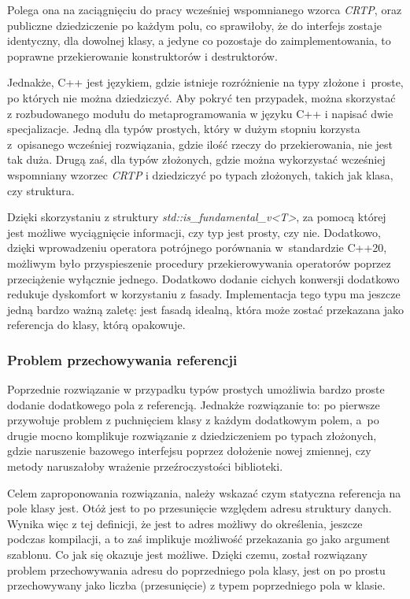 \documentclass[12pt]{article}
\newcommand{\n}{\newline}
\begin{document}
{{{				Polega ona na zaciągnięciu do pracy wcześniej wspomnianego wzorca {\it CRTP}, oraz publiczne dziedziczenie po każdym polu, co sprawiłoby, że
				do interfejs zostaje identyczny, dla dowolnej klasy, a jedyne co pozostaje do zaimplementowania, to poprawne przekierowanie konstruktorów
				i destruktorów.\n

				Jednakże, C++ jest językiem, gdzie istnieje rozróżnienie na typy złożone i~proste, po których nie można dziedziczyć. Aby pokryć ten przypadek,
				można skorzystać z rozbudowanego modułu do metaprogramowania w języku C++ i napisać dwie specjalizacje. Jedną dla typów prostych, który
				w dużym stopniu korzysta z~opisanego wcześniej rozwiązania, gdzie ilość rzeczy do przekierowania, nie jest tak duża. Drugą zaś,
				dla typów złożonych, gdzie można wykorzystać wcześniej wspomniany wzorzec {\it CRTP} i dziedziczyć po typach złożonych, takich jak klasa, czy struktura.\n

				Dzięki skorzystaniu z struktury {\it std::is\_fundamental\_v<T>}\cite{std_is_fundamental}, za pomocą której jest możliwe wyciągnięcie informacji,
				czy typ jest prosty, czy nie. Dodatkowo, dzięki wprowadzeniu operatora potrójnego porównania\cite{starship_operator} w~standardzie C++20, możliwym było
				przyspieszenie procedury przekierowywania operatorów poprzez przeciążenie wyłącznie jednego. Dodatkowo dodanie cichych konwersji dodatkowo redukuje
				dyskomfort w korzystaniu z fasady. Implementacja tego typu ma jeszcze jedną bardzo ważną zaletę: jest fasadą idealną, która może zostać przekazana jako referencja
				do klasy, którą opakowuje.
			}

			{
				\subsubsection{Problem przechowywania referencji}

				Poprzednie rozwiązanie w przypadku typów prostych umożliwia bardzo proste dodanie dodatkowego pola z referencją. Jednakże rozwiązanie to:
				po pierwsze przywołuje problem z puchnięciem klasy z każdym dodatkowym polem, a~po drugie mocno komplikuje rozwiązanie z dziedziczeniem po
				typach złożonych, gdzie naruszenie bazowego interfejsu poprzez dołożenie nowej zmiennej, czy metody naruszałoby wrażenie przeźroczystości
				biblioteki.\n

				Celem zaproponowania rozwiązania, należy wskazać czym statyczna referencja na pole klasy jest. Otóż jest to po przesunięcie względem
				adresu struktury danych. Wynika więc z tej definicji, że jest to adres możliwy do określenia, jeszcze podczas kompilacji,
				a to zaś implikuje możliwość przekazania go jako argument szablonu. Co jak się okazuje jest możliwe. Dzięki czemu, został rozwiązany problem
				przechowywania adresu do poprzedniego pola klasy, jest on po prostu przechowywany jako liczba (przesunięcie) z typem poprzedniego pola w klasie.\n

}}}
\end{document}
